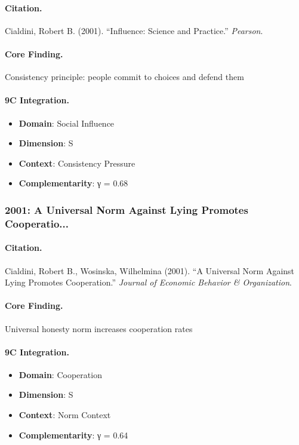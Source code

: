 \paragraph{Citation.}
Cialdini, Robert B. (2001). ``Influence: Science and Practice.''
\textit{Pearson}.

\paragraph{Core Finding.}
Consistency principle: people commit to choices and defend them

\paragraph{9C Integration.}
\begin{itemize}[nosep]
  \item \textbf{Domain}: Social Influence
  \item \textbf{Dimension}: S
  \item \textbf{Context}: Consistency Pressure
  \item \textbf{Complementarity}: γ = 0.68
\end{itemize}

\subsubsection{2001: A Universal Norm Against Lying Promotes Cooperatio...}

\paragraph{Citation.}
Cialdini, Robert B., Wosinska, Wilhelmina (2001). ``A Universal Norm Against Lying Promotes Cooperation.''
\textit{Journal of Economic Behavior & Organization}.

\paragraph{Core Finding.}
Universal honesty norm increases cooperation rates

\paragraph{9C Integration.}
\begin{itemize}[nosep]
  \item \textbf{Domain}: Cooperation
  \item \textbf{Dimension}: S
  \item \textbf{Context}: Norm Context
  \item \textbf{Complementarity}: γ = 0.64
\end{itemize}

